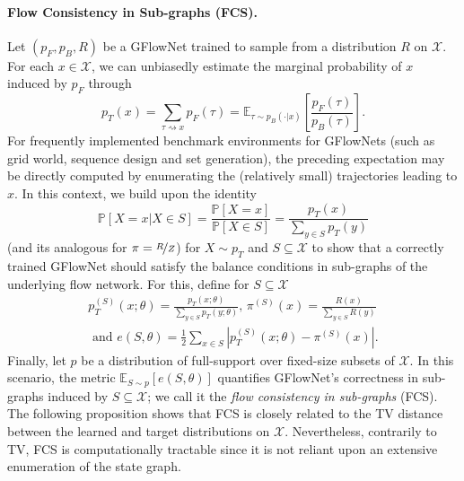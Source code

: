 \documentclass{article}
\theoremstyle{plain}
\theoremstyle{definition}
\theoremstyle{remark}
\theoremstyle{remark}
\begin{document}
\paragraph{Flow Consistency in Sub-graphs (FCS).}  Let $(p_{F}, p_{B}, R)$ be a GFlowNet trained to sample from a distribution $R$ on $\mathcal{X}$. For each $x \in \mathcal{X}$, we can unbiasedly estimate the marginal probability of $x$ induced by $p_{F}$ through 
\begin{equation}
    p_{T}(x) = \sum_{\tau \rightsquigarrow x} p_{F}(\tau) = \mathbb{E}_{\tau \sim p_{B}(\cdot | x)} \left[ \frac{p_{F}(\tau)}{p_{B}(\tau)}  \right]. %
\end{equation}
For frequently implemented benchmark environments for GFlowNets (such as grid world, sequence design and set generation), the preceding expectation may be directly computed by enumerating the (relatively small) trajectories leading to $x$. In this context, we build upon the identity 
\begin{equation}
    \mathbb{P}[X = x | X \in S] = \frac{\mathbb{P}[X = x]}{\mathbb{P}[X \in S]} = \frac{p_{T}(x)}{\sum_{y \in S} p_{T}(y)}  
\end{equation}
(and its analogous for $\pi = \nicefrac{R}{Z}$) for $X \sim  p_{T}$ and $S \subseteq \mathcal{X}$ to show that a correctly trained GFlowNet should satisfy the balance conditions in sub-graphs of the underlying flow network. For this, define for $S \subseteq \mathcal{X}$ 
\begin{equation*}
    \begin{split} 
    p_{T}^{(S)}(x ; \theta) = \frac{p_{T}(x ; \theta)}{\sum_{y \in S} p_{T}(y ; \theta)}, \, \pi^{(S)}(x) = \frac{R(x)}{\sum_{y \in S} R(y)} \\
    \text{ and } e(S, \theta) = \frac{1}{2} \sum_{x \in S} |p_{T}^{(S)}(x ; \theta) - \pi^{(S)}(x)|.
    \end{split} 
\end{equation*}
Finally, let $p$ be a distribution of full-support over fixed-size subsets of $\mathcal{X}$. In this scenario, the metric $\mathbb{E}_{S \sim p}[e(S, \theta)]$ quantifies GFlowNet's correctness in sub-graphs induced by $S \subseteq \mathcal{X}$; we call it the \emph{flow consistency in sub-graphs} (FCS). The following proposition shows that FCS is closely related to the TV distance between the learned and target distributions on $\mathcal{X}$. Nevertheless, contrarily to TV, FCS is computationally tractable since it is not reliant upon an extensive enumeration of the state graph. 
\end{document}
